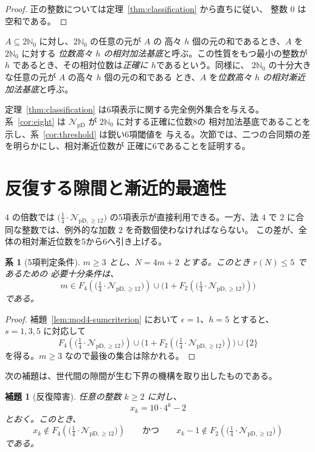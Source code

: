 \documentclass[12pt]{ltjsarticle}
\theoremstyle{plain}
\newtheorem{lemma}[theorem]{補題}
\newtheorem{corollary}[theorem]{系}
\theoremstyle{definition}
\theoremstyle{plain}
\newcommand{\NpD}{\mathcal{N}_{\mathrm{pD}}}
\newcommand{\Pset}{%
  \bigl(\tfrac{1}{4}\cdot\mathcal{N}_{\mathrm{pD},\geq 12}\bigr)%
}
\begin{document}
\begin{proof}
正の整数については定理~\ref{thm:classification} から直ちに従い、
整数 $0$ は空和である。
\end{proof}

$A\subseteq2\mathbb N_0$ に対し、$2\mathbb N_0$ の任意の元が $A$ の
高々 $h$ 個の元の和であるとき、$A$ を $2\mathbb N_0$ に対する
\emph{位数高々 $h$ の相対加法基底}と呼ぶ。この性質をもつ最小の整数が
$h$ であるとき、その相対位数は\emph{正確に $h$}であるという。同様に、
$2\mathbb N_0$ の十分大きな任意の元が $A$ の高々 $h$ 個の元の和である
とき、$A$ を\emph{位数高々 $h$ の相対漸近加法基底}と呼ぶ。

定理~\ref{thm:classification} は6項表示に関する完全例外集合を与える。
系~\ref{cor:eight} は $\NpD$ が $2\mathbb N_0$ に対する正確に位数8の
相対加法基底であることを示し、系~\ref{cor:threshold} は鋭い6項閾値を
与える。次節では、二つの合同類の差を明らかにし、相対漸近位数が
正確に6であることを証明する。

\section{反復する隙間と漸近的最適性}\label{sec:asymptotic}

$4$ の倍数では $\Pset$ の5項表示が直接利用できる。一方、法 $4$ で
$2$ に合同な整数では、例外的な加数 $2$ を奇数個使わなければならない。
この差が、全体の相対漸近位数を5から6へ引き上げる。

\begin{corollary}[5項判定条件]\label{lem:fivecrit}
$m\geq3$ とし、$N=4m+2$ とする。このとき $r(N)\leq5$ であるための
必要十分条件は、
\begin{equation}\label{eq:fivecrit}
 m\in F_4(\Pset)\cup\bigl(1+F_2(\Pset)\bigr)
\end{equation}
である。
\end{corollary}

\begin{proof}
補題~\ref{lem:mod4-sumcriterion} において $\epsilon=1$、$h=5$ とすると、
$s=1,3,5$ に対応して
\[
 F_4(\Pset)\cup\bigl(1+F_2(\Pset)\bigr)\cup\{2\}
\]
を得る。$m\geq3$ なので最後の集合は除かれる。
\end{proof}

次の補題は、世代間の隙間が生む下界の機構を取り出したものである。

\begin{lemma}[反復障害]\label{lem:obstruction}
任意の整数 $k\geq2$ に対し、
\[
 x_k=10\cdot4^k-2
\]
とおく。このとき、
\begin{equation}\label{eq:obstruction}
 x_k\notin F_4(\Pset)
 \qquad\text{かつ}\qquad
 x_k-1\notin F_2(\Pset)
\end{equation}
である。
\end{lemma}
\end{document}
